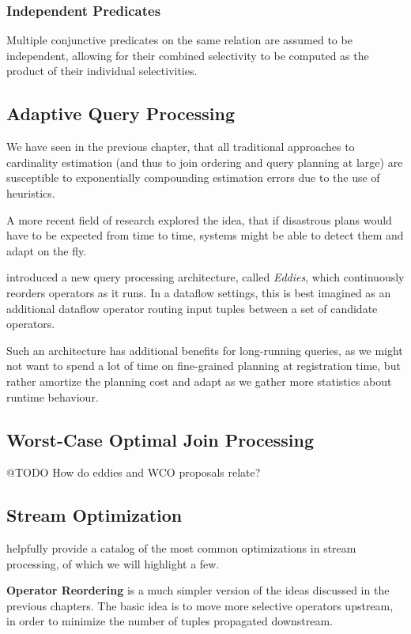 \documentclass[../index.tex]{subfiles}
\begin{document}
\subsubsection{Independent Predicates}

Multiple conjunctive predicates on the same relation are assumed to be
independent, allowing for their combined selectivity to be computed as
the product of their individual selectivities.

\subsection{Adaptive Query Processing}

We have seen in the previous chapter, that all traditional approaches
to cardinality estimation (and thus to join ordering and query
planning at large) are susceptible to exponentially compounding
estimation errors due to the use of heuristics.

A more recent field of research explored the idea, that if disastrous
plans would have to be expected from time to time, systems might be
able to detect them and adapt on the fly.

\cite{avnur2000eddies} introduced a new query processing architecture,
called \emph{Eddies}, which continuously reorders operators as it
runs. In a dataflow settings, this is best imagined as an additional
dataflow operator routing input tuples between a set of candidate
operators.

Such an architecture has additional benefits for long-running queries,
as we might not want to spend a lot of time on fine-grained planning
at registration time, but rather amortize the planning cost and adapt
as we gather more statistics about runtime behaviour.

\subsection{Worst-Case Optimal Join Processing}

@TODO How do eddies and WCO proposals relate?

\subsection{Stream Optimization}

\cite{hirzel2014catalog} helpfully provide a catalog of the most
common optimizations in stream processing, of which we will highlight
a few.

\textbf{Operator Reordering} is a much simpler version of the ideas
discussed in the previous chapters. The basic idea is to move more
selective operators upstream, in order to minimize the number of
tuples propagated downstream.
\end{document}
